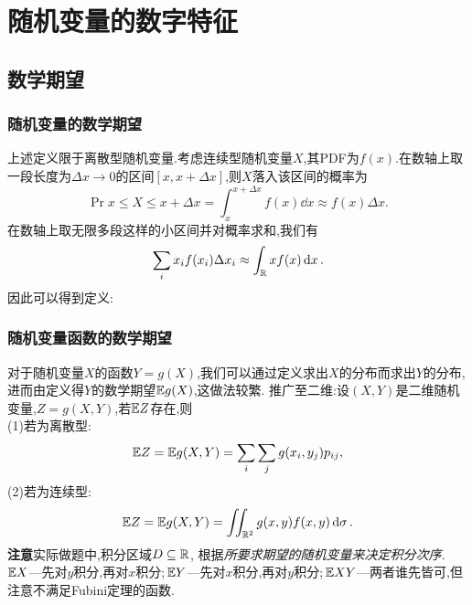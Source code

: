 \chapter{随机变量的数字特征}
\section{数学期望}
\subsection{随机变量的数学期望}

上述定义限于离散型随机变量.考虑连续型随机变量$X$,其PDF为$f(x)$.在数轴上取一段长度为$\Delta x\to 0$的区间$[x,x+\Delta x]$,则$X$落入该区间的概率为
\[\Pr{x\leq X\leq x+\Delta x} = \int_{x}^{x+\Delta x}f(x)\dd{x}\approx f(x)\Delta x.\]
在数轴上取无限多段这样的小区间并对概率求和,我们有
\[\sum_ix_if(x_i)\Delta x_i \approx \int_{\RR}xf(x)\dd{x}.\]
因此可以得到定义:
\subsection{随机变量函数的数学期望}
对于随机变量$X$的函数$Y = g(X)$,我们可以通过定义求出$X$的分布而求出$Y$的分布,进而由定义得$Y$的数学期望$\mathbb{E}{g(X)}$,这做法较繁.\newpage
{}
推广至二维:设$(X,Y)$是二维随机变量,$Z=g(X,Y)$,若$\mathbb{E}{Z}$存在,则\\
(1)若为离散型:
\begin{equation}
    \mathbb{E}{Z} = \mathbb{E}{g(X,Y)} = \sum_{i}\sum_{j}g(x_i,y_j)p_{ij},
    \label{eq:4.5}
\end{equation}
(2)若为连续型:
\begin{equation}
    \EE{Z} = \EE{g(X,Y)} = \iint_{\RR[2]}g(x,y)f(x,y)\dd{\sigma}.
\end{equation}
\textbf{注意}\quad 实际做题中,积分区域$D\subseteq \RR$, 根据\emph{\color{red}所要求期望的随机变量来决定积分次序}.\;\Eg\,$\mathbb{E}{X}$---先对$y$积分,再对$x$积分;\,$\mathbb{E}{Y}$---先对$x$积分,再对$y$积分;\,$\mathbb{E}{XY}$---两者谁先皆可,但注意不满足Fubini定理的函数.
